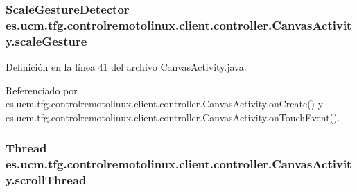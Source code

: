 \hypertarget{classes_1_1ucm_1_1tfg_1_1controlremotolinux_1_1client_1_1controller_1_1CanvasActivity_a68ba3fc3f0711e6c81db1423484db6a7}{
\subsubsection[{scale\-Gesture}]{\setlength{\rightskip}{0pt plus 5cm}Scale\-Gesture\-Detector es.\-ucm.\-tfg.\-controlremotolinux.\-client.\-controller.\-Canvas\-Activity.\-scale\-Gesture\hspace{0.3cm}{\ttfamily [private]}}}\label{classes_1_1ucm_1_1tfg_1_1controlremotolinux_1_1client_1_1controller_1_1CanvasActivity_a68ba3fc3f0711e6c81db1423484db6a7}


Definición en la línea 41 del archivo Canvas\-Activity.\-java.



Referenciado por es.\-ucm.\-tfg.\-controlremotolinux.\-client.\-controller.\-Canvas\-Activity.\-on\-Create() y es.\-ucm.\-tfg.\-controlremotolinux.\-client.\-controller.\-Canvas\-Activity.\-on\-Touch\-Event().

\hypertarget{classes_1_1ucm_1_1tfg_1_1controlremotolinux_1_1client_1_1controller_1_1CanvasActivity_a3f767c3d6228080158c4ac690b4ca4b3}{
\subsubsection[{scroll\-Thread}]{\setlength{\rightskip}{0pt plus 5cm}Thread es.\-ucm.\-tfg.\-controlremotolinux.\-client.\-controller.\-Canvas\-Activity.\-scroll\-Thread\hspace{0.3cm}{\ttfamily [private]}}}\label{classes_1_1ucm_1_1tfg_1_1controlremotolinux_1_1client_1_1controller_1_1CanvasActivity_a3f767c3d6228080158c4ac690b4ca4b3}


